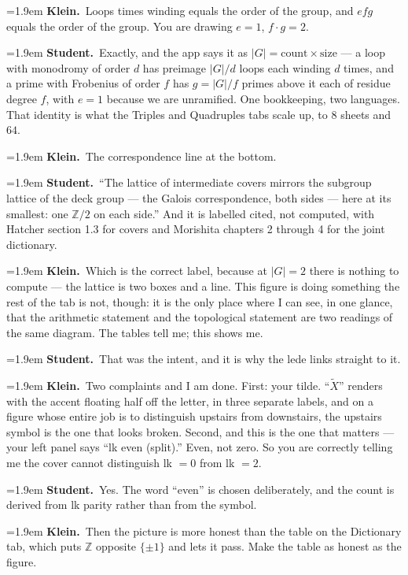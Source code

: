 \documentclass[11pt]{article}
\newcommand{\Stu}[1]{\par\smallskip\noindent\hangindent=1.9em\hangafter=1%
  \textcolor{stucol}{\textbf{Student.}}~#1\par}
\newcommand{\Kle}[1]{\par\smallskip\noindent\hangindent=1.9em\hangafter=1%
  \textcolor{klecol}{\textbf{Klein.}}~#1\par}
\begin{document}
\Kle{Loops times winding equals the order of the group, and $efg$ equals the order of the group. You are drawing $e = 1$, $f \cdot g = 2$.}

\Stu{Exactly, and the app says it as $|G| = \mathrm{count} \times \mathrm{size}$ --- a loop with monodromy of order $d$ has preimage $|G|/d$ loops each winding $d$ times, and a prime with Frobenius of order $f$ has $g = |G|/f$ primes above it each of residue degree $f$, with $e = 1$ because we are unramified. One bookkeeping, two languages. That identity is what the Triples and Quadruples tabs scale up, to $8$ sheets and $64$.}

\Kle{The correspondence line at the bottom.}

\Stu{``The lattice of intermediate covers mirrors the subgroup lattice of the deck group --- the Galois correspondence, both sides --- here at its smallest: one $\mathbb{Z}/2$ on each side.'' And it is labelled cited, not computed, with Hatcher section 1.3 for covers and Morishita chapters 2 through 4 for the joint dictionary.}

\Kle{Which is the correct label, because at $|G| = 2$ there is nothing to compute --- the lattice is two boxes and a line. This figure is doing something the rest of the tab is not, though: it is the only place where I can see, in one glance, that the arithmetic statement and the topological statement are two readings of the same diagram. The tables tell me; this shows me.}

\Stu{That was the intent, and it is why the lede links straight to it.}

\Kle{Two complaints and I am done. First: your tilde. ``$\tilde X$'' renders with the accent floating half off the letter, in three separate labels, and on a figure whose entire job is to distinguish upstairs from downstairs, the upstairs symbol is the one that looks broken. Second, and this is the one that matters --- your left panel says ``lk even (split).'' Even, not zero. So you are correctly telling me the cover cannot distinguish lk $= 0$ from lk $= 2$.}

\Stu{Yes. The word ``even'' is chosen deliberately, and the count is derived from lk parity rather than from the symbol.}

\Kle{Then the picture is more honest than the table on the Dictionary tab, which puts $\mathbb{Z}$ opposite $\{\pm 1\}$ and lets it pass. Make the table as honest as the figure.}
\end{document}
